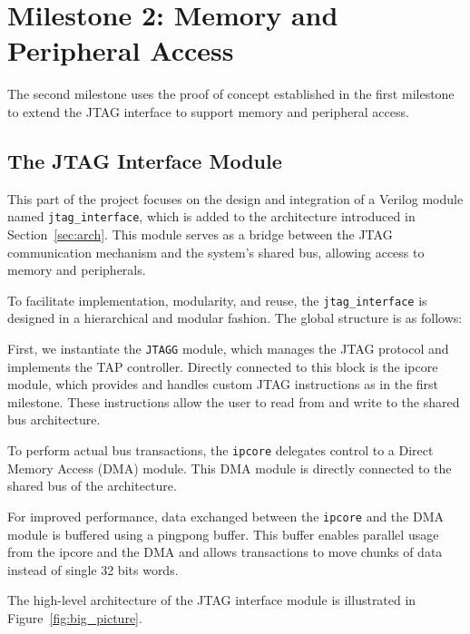 \documentclass[a4paper,11pt,oneside]{report}
\begin{document}
\section{Milestone 2: Memory and Peripheral Access}

The second milestone uses the proof of concept established in the first milestone to extend the JTAG interface to support memory and peripheral access.

\subsection{The JTAG Interface Module}

This part of the project focuses on the design and integration of a Verilog module named \texttt{jtag\_interface}, which is added to the architecture introduced in Section~\ref{sec:arch}. 
This module serves as a bridge between the JTAG communication mechanism and the system's shared bus, allowing access to memory and peripherals.

To facilitate implementation, modularity, and reuse, the \texttt{jtag\_interface} is designed in a hierarchical and modular fashion. The global structure is as follows:

First, we instantiate the \texttt{JTAGG} module, which manages the JTAG protocol and implements the TAP controller.  
Directly connected to this block is the ipcore module, which provides and handles custom JTAG instructions as in the first milestone.  
These instructions allow the user to read from and write to the shared bus architecture.  

To perform actual bus transactions, the \texttt{ipcore} delegates control to a Direct Memory Access (DMA) module.  
This DMA module is directly connected to the shared bus of the architecture.  

For improved performance, data exchanged between the \texttt{ipcore} and the DMA module is buffered using a pingpong buffer.  
This buffer enables  parallel usage from the ipcore and the DMA and allows transactions to move chunks of data instead of single 32 bits words.

The high-level architecture of the JTAG interface module is illustrated in Figure~\ref{fig:big_picture}.
\end{document}
